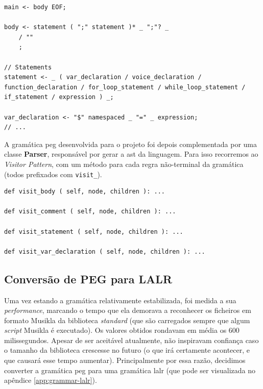 \begin{lstlisting}[caption={Excerto da gramática desenvolvida}]
main <- body EOF;

body <- statement ( ";" statement )* _ ";"? _
    / ""
    ;

// Statements
statement <- _ ( var_declaration / voice_declaration / function_declaration / for_loop_statement / while_loop_statement / if_statement / expression ) _;

var_declaration <- "$" namespaced _ "=" _ expression;
// ...
\end{lstlisting}

A gramática \acrshort{peg} desenvolvida para o projeto foi depois complementada por uma classe \textbf{Parser}, responsável por gerar a \acrshort{ast} da linguagem. Para isso recorremos ao \textit{Visitor Pattern}, com um método para cada regra não-terminal da gramática (todos prefixados com \texttt{visit\_}).

\begin{lstlisting}[caption={Métodos responsáveis por criarem a AST}]
def visit_body ( self, node, children ): ...

def visit_comment ( self, node, children ): ...

def visit_statement ( self, node, children ): ...

def visit_var_declaration ( self, node, children ): ...
\end{lstlisting}

\subsection{Conversão de PEG para LALR}
Uma vez estando a gramática relativamente estabilizada, foi medida a sua \textit{performance}, marcando o tempo que ela demorava a reconhecer os ficheiros em formato Musikla da biblioteca \textit{standard} (que são carregados sempre que algum \textit{script} Musikla é executado). Os valores obtidos rondavam em média os 600 milissegundos. Apesar de ser aceitável atualmente, não inspiravam confiança caso o tamanho da biblioteca crescesse no futuro (o que irá certamente acontecer, e que causará esse tempo aumentar). Principalmente por essa razão, decidimos converter a gramática \acrshort{peg} para uma gramática \acrfull{lalr} (que pode ser visualizada no apêndice \ref{app:grammar-lalr}).

